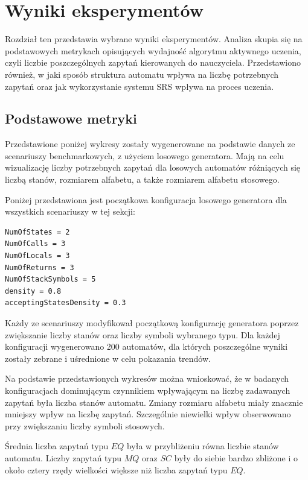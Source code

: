 \chapter{Wyniki eksperymentów}

Rozdział ten przedstawia wybrane wyniki eksperymentów. Analiza skupia się na podstawowych metrykach opisujących
wydajność algorytmu aktywnego uczenia, czyli liczbie poszczególnych zapytań kierowanych do nauczyciela.
Przedstawiono również, w jaki sposób struktura automatu wpływa na liczbę potrzebnych zapytań
oraz jak wykorzystanie systemu SRS wpływa na proces uczenia.

\section{Podstawowe metryki}

Przedstawione poniżej wykresy zostały wygenerowane na podstawie danych ze scenariuszy benchmarkowych, z użyciem losowego generatora.
Mają na celu wizualizację liczby potrzebnych zapytań dla losowych automatów różniących się liczbą stanów,
rozmiarem alfabetu, a także rozmiarem alfabetu stosowego.

Poniżej przedstawiona jest początkowa konfiguracja losowego generatora dla wszystkich scenariuszy w tej sekcji:
\begin{verbatim}
NumOfStates = 2
NumOfCalls = 3
NumOfLocals = 3
NumOfReturns = 3
NumOfStackSymbols = 5
density = 0.8
acceptingStatesDensity = 0.3
\end{verbatim}

Każdy ze scenariuszy modyfikował początkową konfigurację generatora poprzez zwiększanie liczby stanów oraz
liczby symboli wybranego typu. Dla każdej konfiguracji wygenerowano 200 automatów,
dla których poszczególne wyniki zostały zebrane i uśrednione w celu pokazania trendów.



Na podstawie przedstawionych wykresów można wnioskować, że w badanych konfiguracjach dominującym czynnikiem
wpływającym na liczbę zadawanych zapytań była liczba stanów automatu. Zmiany rozmiaru alfabetu miały
znacznie mniejszy wpływ na liczbę zapytań.
Szczególnie niewielki wpływ obserwowano przy zwiększaniu liczby symboli stosowych.

Średnia liczba zapytań typu $EQ$ była w przybliżeniu równa liczbie stanów automatu.
Liczby zapytań typu $MQ$ oraz $SC$ były do siebie bardzo zbliżone i o około cztery
rzędy wielkości większe niż liczba zapytań typu $EQ$.

